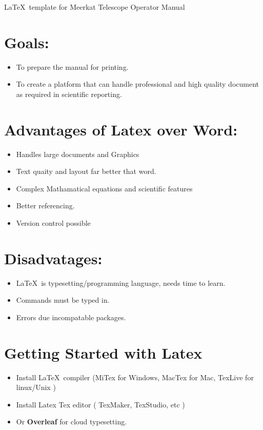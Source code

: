 \documentclass[30pt]{report}
\author{Authors:  Telescope Operators}
\date{}
\begin{document}
{\huge
\noindent
\LaTeX\  template for Meerkat Telescope Operator Manual
	
\noindent
\section*{Goals:}
\begin{itemize}
  \item To prepare the manual for printing.
  
  \item To create a platform that can handle professional and high quality document as required in scientific reporting.
\end{itemize}
  
\noindent  
\section*{Advantages of Latex over Word:}
\begin{itemize}
   \item Handles large documents and Graphics 
   \item Text quaity and layout far better that word.
   \item  Complex Mathamatical equations and scientific features
    \item  Better referencing.
    \item Version control possible 
\end{itemize}  
\section*{Disadvatages:}
\begin{itemize}
   \item   \LaTeX\ is typesetting/programming language, needs time to learn.
   \item  Commands must be typed in.
  \item   Errors due incompatable packages.
\end{itemize}  
\noindent   
 \section*{Getting Started with Latex}
 \begin{itemize} 
 	
   \item Install \LaTeX\ compiler (MiTex for Windows, MacTex for Mac, TexLive for linux/Unix )
   \item Install Latex Tex editor ( TexMaker, TexStudio, etc )
   \item Or \textbf{Overleaf} for cloud typesetting.
   



\end{itemize}}
\end{document}
